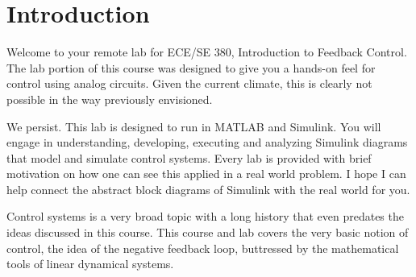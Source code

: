 \chapter{Introduction}
Welcome to your remote lab for ECE/SE 380, Introduction to Feedback Control.
The lab portion of this course was designed to give you a hands-on
feel for control using analog circuits. Given the current climate, this is
clearly not possible in the way previously envisioned.

We persist. This lab is designed to run in MATLAB and Simulink. You will engage
in understanding, developing, executing and analyzing Simulink
diagrams that model and simulate control systems. Every lab is
provided with brief motivation on how one can see this applied in a real
world problem. I hope I can help connect the abstract block diagrams of
Simulink with the real world for you.

Control systems is a very broad topic with a long history that even predates
the ideas discussed in this course. This course and lab covers the very basic
notion of control, the idea of the negative feedback loop, buttressed by
the mathematical tools of linear dynamical systems.

